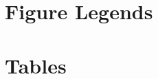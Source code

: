 \documentclass[10pt]{article}
\begin{document}
\begin{spacing}{1.5}
\section*{Figure Legends}


\section*{Tables}


\end{spacing}
\end{document}

